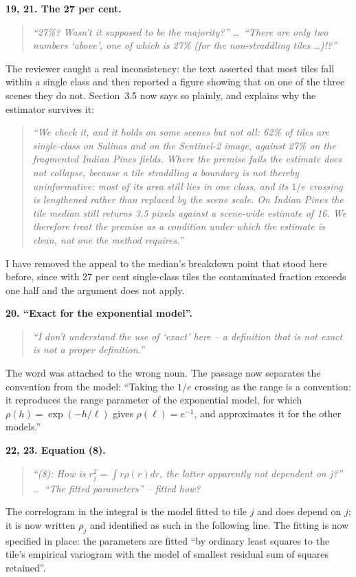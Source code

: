 \documentclass[11pt]{article}
\newcommand{\R}[1]{\medskip\noindent\textbf{#1}\quad}
\newenvironment{rquote}{\begin{quote}\itshape}{\end{quote}}
\begin{document}
\R{19, 21. The 27 per cent.}
\begin{rquote}
``27\%? Wasn't it supposed to be the majority?'' \dots\ ``There are only two
numbers `above', one of which is 27\% (for the non-straddling tiles \dots)!?''
\end{rquote}
The reviewer caught a real inconsistency: the text asserted that most tiles fall
within a single class and then reported a figure showing that on one of the
three scenes they do not. Section~3.5 now says so plainly, and explains why the
estimator survives it:
\begin{rquote}
``We check it, and it holds on some scenes but not all: 62\% of tiles are
single-class on Salinas and on the Sentinel-2 image, against 27\% on the
fragmented Indian Pines fields. Where the premise fails the estimate does not
collapse, because a tile straddling a boundary is not thereby uninformative:
most of its area still lies in one class, and its $1/e$ crossing is lengthened
rather than replaced by the scene scale. On Indian Pines the tile median still
returns 3.5 pixels against a scene-wide estimate of 16. We therefore treat the
premise as a condition under which the estimate is clean, not one the method
requires.''
\end{rquote}
I have removed the appeal to the median's breakdown point that stood here
before, since with 27 per cent single-class tiles the contaminated fraction
exceeds one half and the argument does not apply.

\R{20. ``Exact for the exponential model''.}
\begin{rquote}
``I don't understand the use of `exact' here -- a definition that is not exact
is not a proper definition.''
\end{rquote}
The word was attached to the wrong noun. The passage now separates the
convention from the model: ``Taking the $1/e$ crossing as the range is a
convention: it reproduces the range parameter of the exponential model, for
which $\rho(h)=\exp(-h/\ell)$ gives $\rho(\ell)=e^{-1}$, and approximates it for
the other models.''

\R{22, 23. Equation (8).}
\begin{rquote}
``(8): How is $r_j^2=\int r\rho(r)dr$, the latter apparently not dependent on
j?'' \dots\ ``The fitted parameters'' -- fitted how?
\end{rquote}
The correlogram in the integral is the model fitted to tile $j$ and does depend
on $j$; it is now written $\rho_j$ and identified as such in the following
line. The fitting is now specified in place: the parameters are fitted ``by
ordinary least squares to the tile's empirical variogram with the model of
smallest residual sum of squares retained''.
\end{document}
